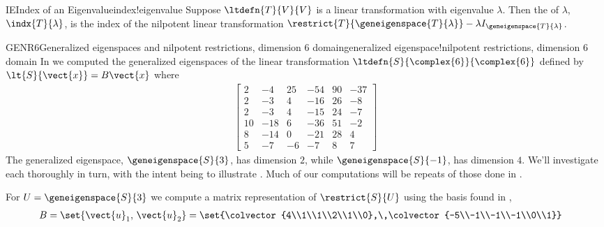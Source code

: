 %
\begin{definition}{IE}{Index of an Eigenvalue}{index!eigenvalue}
Suppose $\ltdefn{T}{V}{V}$ is a linear transformation with eigenvalue $\lambda$.  Then the  of $\lambda$, $\indx{T}{\lambda}$, is the index of the nilpotent linear transformation $\restrict{T}{\geneigenspace{T}{\lambda}}-\lambda I_{\geneigenspace{T}{\lambda}}$.
\end{definition}
%
%
\begin{example}{GENR6}{Generalized eigenspaces and nilpotent restrictions, dimension 6 domain}{generalized eigenspace!nilpotent restrictions, dimension 6 domain}
%
In  we computed the generalized eigenspaces of the linear transformation $\ltdefn{S}{\complex{6}}{\complex{6}}$  defined by $\lt{S}{\vect{x}}=B\vect{x}$ where
%
\begin{align*}
\begin{bmatrix}
 2 & -4 & 25 & -54 & 90 & -37 \\
 2 & -3 & 4 & -16 & 26 & -8 \\
 2 & -3 & 4 & -15 & 24 & -7 \\
 10 & -18 & 6 & -36 & 51 & -2 \\
 8 & -14 & 0 & -21 & 28 & 4 \\
 5 & -7 & -6 & -7 & 8 & 7
\end{bmatrix}
\end{align*}
%
The generalized eigenspace, $\geneigenspace{S}{3}$, has dimension $2$, while  $\geneigenspace{S}{-1}$, has dimension $4$.  We'll investigate each thoroughly in turn, with the intent being to illustrate .  Much of our computations will be repeats of those done in .\par
%
For $U=\geneigenspace{S}{3}$ we compute a matrix representation of $\restrict{S}{U}$ using the basis found in ,
%
\begin{align*}
B&=\set{\vect{u}_1,\,\vect{u}_2}
=\set{\colvector{4\\1\\1\\2\\1\\0},\,\colvector{-5\\-1\\-1\\-1\\0\\1}}

\end{align*}
\end{example}
